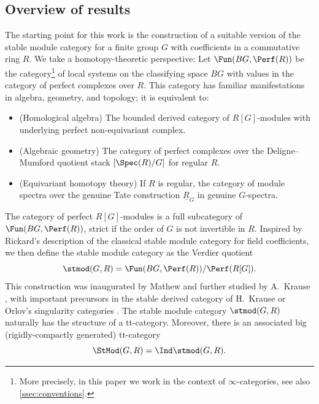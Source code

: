 \documentclass{amsart}%
\numberwithin{equation}{section}%
\theoremstyle{remark}
\begin{document}
\subsection{Overview of results}

The starting point for this work is the construction of a suitable version of the stable module category for a finite group $G$ with coefficients in a commutative ring $R$. We take a homotopy-theoretic perspective: Let $\Fun(BG,\Perf(R))$ be the category\footnote{More precisely, in this paper we work in the context of $\infty$-categories, see also \cref{ssec:conventions}.} of local systems on the classifying space $BG$ with values in the category of perfect complexes over $R$. This category has familiar manifestations in algebra, geometry, and topology; it is equivalent to:
\begin{itemize}
    \item (Homological algebra) The bounded derived category of $R[G]$-modules with underlying perfect non-equivariant complex.
    \item (Algebraic geometry) The category of perfect complexes over the Deligne--Mumford quotient stack $[\Spec(R)/G]$ for regular $R$.
    \item (Equivariant homotopy theory) If $R$ is regular, the category of module spectra over the genuine Tate construction $\underline{R}_G$ in genuine $G$-spectra.
\end{itemize}
The category of perfect $R[G]$-modules is a full subcategory of $\Fun(BG,\Perf(R))$, strict if the order of $G$ is not invertible in $R$. Inspired by Rickard's description of the classical stable module category for field coefficients, we then define the stable module category as the Verdier quotient
\[
\stmod(G,R) = \Fun(BG,\Perf(R)) / \Perf(R[G]).
\]
This construction was inaugurated by Mathew \cite{mathew_torus,treumannmathew_reps} and further studied by A.~Krause \cite{krause_picard}, with important precursors in the stable derived category of H.~Krause \cite{krause_stablederived} or Orlov's singularity categories \cite{Orlov04}. The stable module category $\stmod(G,R)$ naturally has the structure of a tt-category. Moreover, there is an associated big (rigidly-compactly generated) tt-category 
\[
\StMod(G,R) = \Ind\stmod(G,R).
\]
\end{document}
